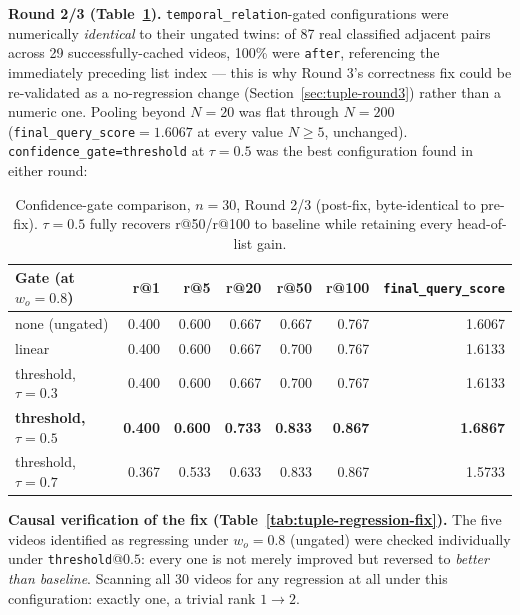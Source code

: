 \documentclass[11pt]{article}
\newcommand{\code}[1]{\texttt{\small #1}}
\begin{document}
\textbf{Round 2/3 (Table~\ref{tab:tuple-gate}).} \code{temporal\_relation}-gated
configurations were numerically \emph{identical} to their ungated twins:
of 87 real classified adjacent pairs across 29 successfully-cached videos,
100\% were \code{after}, referencing the immediately preceding list index
--- this is why Round 3's correctness fix could be re-validated as a
no-regression change (Section~\ref{sec:tuple-round3}) rather than a numeric
one. Pooling beyond $N{=}20$ was flat through $N{=}200$
(\code{final\_query\_score}$=1.6067$ at every value $N\ge5$, unchanged).
\code{confidence\_gate=threshold} at $\tau=0.5$ was the best configuration
found in either round:

\begin{table}[h]
\centering\small
\begin{tabular}{@{}lrrrrrr@{}}
\toprule
Gate (at $w_o{=}0.8$) & r@1 & r@5 & r@20 & r@50 & r@100 & \code{final\_query\_score} \\
\midrule
none (ungated) & 0.400 & 0.600 & 0.667 & 0.667 & 0.767 & 1.6067 \\
linear & 0.400 & 0.600 & 0.667 & 0.700 & 0.767 & 1.6133 \\
threshold, $\tau{=}0.3$ & 0.400 & 0.600 & 0.667 & 0.700 & 0.767 & 1.6133 \\
\textbf{threshold, $\tau{=}0.5$} & \textbf{0.400} & \textbf{0.600} & \textbf{0.733} & \textbf{0.833} & \textbf{0.867} & \textbf{1.6867} \\
threshold, $\tau{=}0.7$ & 0.367 & 0.533 & 0.633 & 0.833 & 0.867 & 1.5733 \\
\bottomrule
\end{tabular}
\caption{Confidence-gate comparison, $n=30$, Round 2/3 (post-fix, byte-identical to
pre-fix). $\tau{=}0.5$ fully recovers r@50/r@100 to baseline while retaining
every head-of-list gain.}
\label{tab:tuple-gate}
\end{table}

\textbf{Causal verification of the fix (Table~\ref{tab:tuple-regression-fix}).}
The five videos identified as regressing under $w_o{=}0.8$ (ungated) were
checked individually under \code{threshold}@$0.5$: every one is not merely
improved but reversed to \emph{better than baseline}. Scanning all 30
videos for any regression at all under this configuration: exactly one, a
trivial rank $1\to2$.
\end{document}
